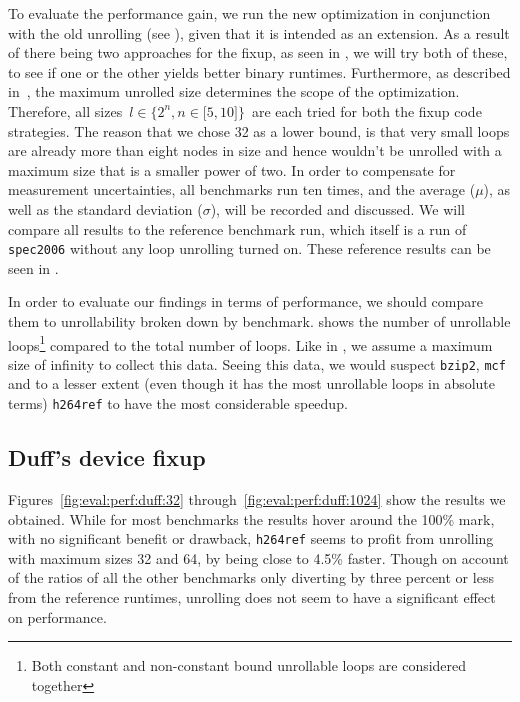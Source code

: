 To evaluate the performance gain, we run the new optimization in conjunction with the old unrolling (see ), given that it is intended as an extension.
As a result of there being two approaches for the fixup, as seen in , we will try both of these, to see if one or the other yields better binary runtimes.
Furthermore, as described in~, the maximum unrolled size determines  the scope of the optimization.
Therefore, all sizes~$l \in \{2^n, n \in \lbrack 5, 10 \rbrack \}$~are each tried for both the fixup code strategies.
The reason that we chose 32 as a lower bound, is that very small loops are already more than eight nodes in size and hence wouldn't be unrolled with a maximum size that is a smaller power of two.
In order to compensate for measurement uncertainties, all benchmarks run ten times, and the average ($\mu$), as well as the standard deviation ($\sigma$), will be recorded and discussed.
We will compare all results to the reference benchmark run, which itself is a run of \texttt{spec2006} without any loop unrolling turned on.
These reference results can be seen in .

In order to evaluate our findings in terms of performance, we should compare them to unrollability broken down by benchmark.
 shows the number of unrollable loops\footnote{Both constant and non-constant bound unrollable loops are considered together} compared to the total number of loops.
Like in , we assume a maximum size of infinity to collect this data.
Seeing this data, we would suspect \texttt{bzip2}, \texttt{mcf} and to a lesser extent (even though it has the most unrollable loops in absolute terms) \texttt{h264ref} to have the most considerable speedup.





\subsection{Duff's device fixup}\label{sec:eval:perf:duff}

Figures~\ref{fig:eval:perf:duff:32} through~\ref{fig:eval:perf:duff:1024} show the results we obtained.
While for most benchmarks the results hover around the 100\% mark, with no significant benefit or drawback, \texttt{h264ref} seems to profit from unrolling with maximum sizes 32 and 64, by being close to 4.5\% faster.
Though on account of the ratios of all the other benchmarks only diverting by three percent or less from the reference runtimes, unrolling does not seem to have a significant effect on performance.

